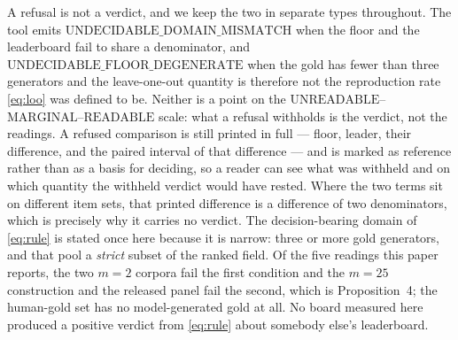 \documentclass{article}
\begin{document}
A refusal is not a verdict, and we keep the two in separate types throughout. The tool emits $\mathrm{UNDECIDABLE\_DOMAIN\_MISMATCH}$ when the floor and the leaderboard fail to share a denominator, and $\mathrm{UNDECIDABLE\_FLOOR\_DEGENERATE}$ when the gold has fewer than three generators and the leave-one-out quantity is therefore not the reproduction rate \eqref{eq:loo} was defined to be. Neither is a point on the $\mathrm{UNREADABLE}$--$\mathrm{MARGINAL}$--$\mathrm{READABLE}$ scale: what a refusal withholds is the verdict, not the readings. A refused comparison is still printed in full --- floor, leader, their difference, and the paired interval of that difference --- and is marked as reference rather than as a basis for deciding, so a reader can see what was withheld and on which quantity the withheld verdict would have rested. Where the two terms sit on different item sets, that printed difference is a difference of two denominators, which is precisely why it carries no verdict. The decision-bearing domain of \eqref{eq:rule} is stated once here because it is narrow: three or more gold generators, and that pool a \emph{strict} subset of the ranked field. Of the five readings this paper reports, the two $m=2$ corpora fail the first condition and the $m=25$ construction and the released panel fail the second, which is Proposition~4; the human-gold set has no model-generated gold at all. No board measured here produced a positive verdict from \eqref{eq:rule} about somebody else's leaderboard.
\end{document}
